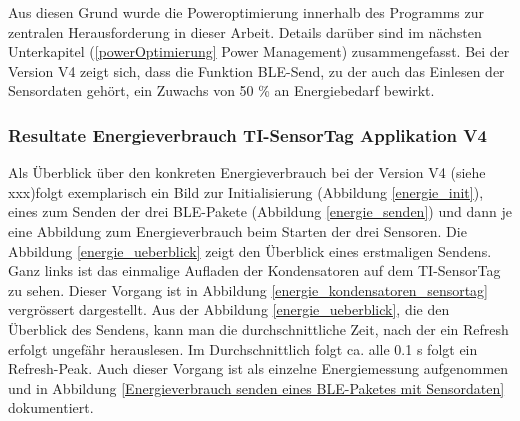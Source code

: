 Aus diesen Grund wurde die Poweroptimierung innerhalb des Programms zur zentralen Herausforderung in dieser Arbeit. Details darüber sind im nächsten Unterkapitel (\ref{powerOptimierung} Power Management) zusammengefasst. Bei der Version V4 zeigt sich, dass die Funktion BLE-Send, zu der auch das Einlesen der Sensordaten gehört, ein Zuwachs von 50 \% an Energiebedarf bewirkt. 



\subsubsection{Resultate Energieverbrauch TI-SensorTag Applikation V4}
\label{energie_sensortag} 

Als Überblick über den konkreten Energieverbrauch bei der Version V4 (siehe  xxx)folgt exemplarisch ein Bild zur Initialisierung (Abbildung \ref{energie_init}), eines zum Senden der drei BLE-Pakete (Abbildung \ref{energie_senden}) und dann je eine Abbildung zum Energieverbrauch beim Starten der drei Sensoren. Die Abbildung \ref{energie_ueberblick} zeigt den Überblick eines erstmaligen Sendens. Ganz links ist das einmalige Aufladen der Kondensatoren auf dem TI-SensorTag zu sehen. Dieser Vorgang ist in Abbildung \ref{energie_kondensatoren_sensortag} vergrössert dargestellt. Aus der Abbildung \ref{energie_ueberblick}, die den Überblick des Sendens, kann man die durchschnittliche Zeit, nach der ein Refresh erfolgt ungefähr herauslesen. Im Durchschnittlich folgt ca. alle 0.1 s folgt ein Refresh-Peak. Auch dieser Vorgang ist als einzelne Energiemessung aufgenommen und in Abbildung \ref{Energieverbrauch senden eines BLE-Paketes mit Sensordaten} dokumentiert. 

\clearpage

